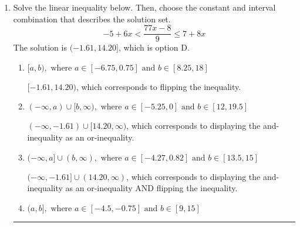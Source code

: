 \documentclass{extbook}[14pt]
\newcommand{\litem}[1]{\item #1

\rule{\textwidth}{0.4pt}}
\begin{document}
\begin{enumerate}
{\begin{enumerate}[label=\Alph*.]
 $(-\infty, -0.5)$, which corresponds to negating the endpoint of the solution.
\item \( (-\infty, a), \text{ where } a \in [-0.23, 0.73] \)

* $(-\infty, 0.5)$, which is the correct option.
\item \( (a, \infty), \text{ where } a \in [0.25, 1.38] \)

 $(0.5, \infty)$, which corresponds to switching the direction of the interval. You likely did this if you did not flip the inequality when dividing by a negative!
\item \( (a, \infty), \text{ where } a \in [-1.27, -0.08] \)

 $(-0.5, \infty)$, which corresponds to switching the direction of the interval AND negating the endpoint. You likely did this if you did not flip the inequality when dividing by a negative as well as not moving values over to a side properly.
\item \( \text{None of the above}. \)

You may have chosen this if you thought the inequality did not match the ends of the intervals.
\end{enumerate}

\textbf{General Comment:} Remember that less/greater than or equal to includes the endpoint, while less/greater do not. Also, remember that you need to flip the inequality when you multiply or divide by a negative.
}
\litem{
Solve the linear inequality below. Then, choose the constant and interval combination that describes the solution set.
\[ -5 + 6 x < \frac{77 x - 8}{9} \leq 7 + 8 x \]The solution is \( (-1.61, 14.20] \), which is option D.\begin{enumerate}[label=\Alph*.]
\item \( [a, b), \text{ where } a \in [-6.75, 0.75] \text{ and } b \in [8.25, 18] \)

$[-1.61, 14.20)$, which corresponds to flipping the inequality.
\item \( (-\infty, a) \cup [b, \infty), \text{ where } a \in [-5.25, 0] \text{ and } b \in [12, 19.5] \)

$(-\infty, -1.61) \cup [14.20, \infty)$, which corresponds to displaying the and-inequality as an or-inequality.
\item \( (-\infty, a] \cup (b, \infty), \text{ where } a \in [-4.27, 0.82] \text{ and } b \in [13.5, 15] \)

$(-\infty, -1.61] \cup (14.20, \infty)$, which corresponds to displaying the and-inequality as an or-inequality AND flipping the inequality.
\item \( (a, b], \text{ where } a \in [-4.5, -0.75] \text{ and } b \in [9, 15] \)


\end{enumerate}}
\end{enumerate}
\end{document}
